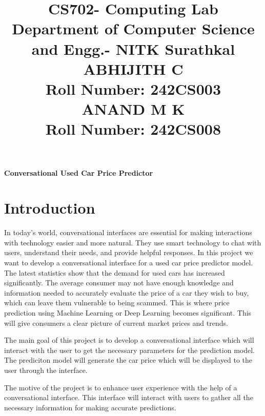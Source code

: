 \documentclass[a4paper,12pt]{article}
\title{
  \vspace{-2em} %
  \textbf{CS702- Computing Lab} \\ %
  \large \textbf{ Department of Computer Science and Engg.- NITK Surathkal} \\ %
  \vspace{1em} %
  \textbf{ABHIJITH C} \\ %
  Roll Number: 242CS003 \\%
  \textbf{ANAND M K} \\ %
  Roll Number: 242CS008 \\%
}
\date{} %
\begin{document}
\maketitle

\begin{titlepage}
\begin{center}

    \vspace*{0.1in}

    {\Huge\bfseries Conversational Used Car Price Predictor\par}
    \vspace{1in}
\end{center}

\section*{Introduction}
\begin{justify}
In today’s world, conversational interfaces are essential for making interactions with technology easier and more natural. They use smart technology to chat with users, understand their needs, and provide helpful responses. In this project we want to develop a conversational interface for a used car price predictor model.  The latest statistics show that the demand for used cars has increased significantly.  The average consumer may not have enough knowledge and information needed to accurately evaluate the price of a car they wish to buy, which can leave them vulnerable to being scammed. This is where price prediction using Machine Learning or Deep Learning becomes significant. This will give consumers a clear picture of current market prices and trends. 
\newline

The main goal of this project is to develop a conversational interface which will interact with the user to get the necessary parameters for the prediction model. The prediciton model will generate the car price which will be displayed to the user through the interface.
\newline

The motive of the project is to enhance user experience with the help of a conversational interface. This interface will interact with users to gather all the necessary information for making accurate predictions.

\end{justify}


\end{titlepage}
\end{document}
